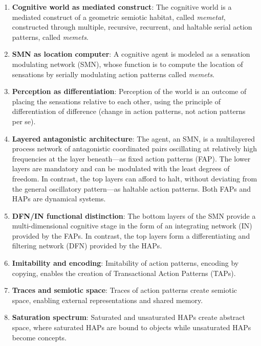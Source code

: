\begin{enumerate}
    \item \textbf{Cognitive world as mediated construct}: The cognitive world is a mediated construct of a geometric semiotic habitat, called \textit{memetat}, constructed through multiple, recursive, recurrent, and haltable serial action patterns, called \textit{memets}.
    
    \item \textbf{SMN as location computer}: A cognitive agent is modeled as a sensation modulating network (SMN), whose function is to compute the location of sensations by serially modulating action patterns called \textit{memets}.
    
    \item \textbf{Perception as differentiation}: Perception of the world is an outcome of placing the sensations relative to each other, using the principle of differentiation of difference (change in action patterns, not action patterns per se).
    
    \item \textbf{Layered antagonistic architecture}: The agent, an SMN, is a multilayered process network of antagonistic coordinated pairs oscillating at relatively high frequencies at the layer beneath---as fixed action patterns (FAP). The lower layers are mandatory and can be modulated with the least degrees of freedom. In contrast, the top layers can afford to halt, without deviating from the general oscillatory pattern---as haltable action patterns. Both FAPs and HAPs are dynamical systems.
    
    \item \textbf{DFN/IN functional distinction}: The bottom layers of the SMN provide a multi-dimensional cognitive stage in the form of an integrating network (IN) provided by the FAPs. In contrast, the top layers form a differentiating and filtering network (DFN) provided by the HAPs.
    
    \item \textbf{Imitability and encoding}: Imitability of action patterns, encoding by copying, enables the creation of Transactional Action Patterns (TAPs).
    
    \item \textbf{Traces and semiotic space}: Traces of action patterns create semiotic space, enabling external representations and shared memory.
    
    \item \textbf{Saturation spectrum}: Saturated and unsaturated HAPs create abstract space, where saturated HAPs are bound to objects while unsaturated HAPs become concepts.
    

\end{enumerate}
